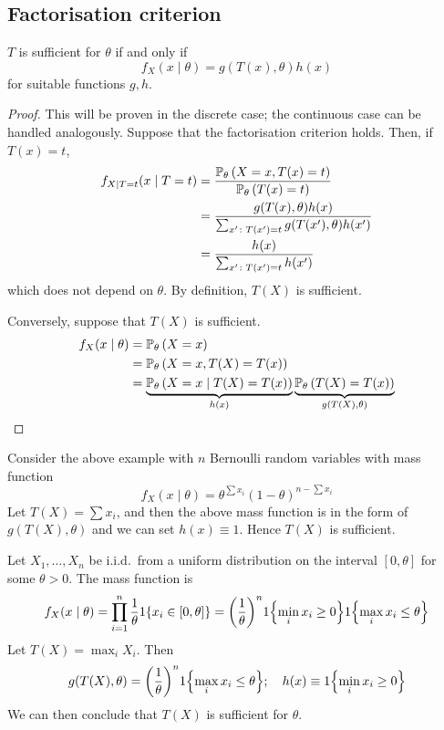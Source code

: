 \subsection{Factorisation criterion}
\begin{theorem}
	\( T \) is sufficient for \( \theta \) if and only if
	\[
		f_X(x \mid \theta) = g(T(x), \theta) h(x)
	\]
	for suitable functions \( g,h \).
\end{theorem}
\begin{proof}
	This will be proven in the discrete case; the continuous case can be handled analogously.
	Suppose that the factorisation criterion holds.
	Then, if \( T(x) = t \),
	\begin{align*}
		f_{X \mid T = t}(x \mid T = t) & = \frac{\mathbb{P}_{\theta}\left({X = x, T(x) = t}\right)}{\mathbb{P}_{\theta}\left({T(x) = t}\right)}             \\
		                               & = \frac{g(T(x),\theta)h(x)}{\sum_{x' \colon T(x') = t} g(T(x'),\theta)h(x')} \\
		                               & = \frac{h(x)}{\sum_{x' \colon T(x') = t} h(x')}
	\end{align*}
	which does not depend on \( \theta \).
	By definition, \( T(X) \) is sufficient.

	Conversely, suppose that \( T(X) \) is sufficient.
	\begin{align*}
		f_X(x \mid \theta) & = \mathbb{P}_{\theta}\left({X = x}\right)                                                                                                \\
		                   & = \mathbb{P}_{\theta}\left({X = x, T(X) = T(x)}\right)                                                                                   \\
		                   & = \underbrace{\mathbb{P}_{\theta}\left({X = x \mid T(X) = T(x)}\right)}_{h(x)} \underbrace{\mathbb{P}_{\theta}\left({T(X) = T(x)}\right)}_{g(T(X), \theta)}
	\end{align*}
\end{proof}
\begin{example}
	Consider the above example with \( n \) Bernoulli random variables with mass function
	\[
		f_X(x \mid \theta) = \theta^{\sum x_i} (1-\theta)^{n - \sum x_i}
	\]
	Let \( T(X) = \sum x_i \), and then the above mass function is in the form of \( g(T(X), \theta) \) and we can set \( h(x) \equiv 1 \).
	Hence \( T(X) \) is sufficient.
\end{example}
\begin{example}
	Let \( X_1, \dots, X_n \) be i.i.d.\ from a uniform distribution on the interval \( [0,\theta] \) for some \( \theta > 0 \).
	The mass function is
	\[
		f_X(x \mid \theta) = \prod_{i=1}^n \frac{1}{\theta} 1\qty{x_i \in [0,\theta]} = \qty(\frac{1}{\theta})^{n} 1\qty{\min_i x_i \geq 0} 1\qty{\max_i x_i \leq \theta}
	\]
	Let \( T(X) = \max_i X_i \).
	Then
	\[
		g(T(X), \theta) = \qty(\frac{1}{\theta})^n 1\qty{\max_i x_i \leq \theta};\quad h(x) \equiv 1\qty{\min_i x_i \geq 0}
	\]
	We can then conclude that \( T(X) \) is sufficient for \( \theta \).
\end{example}

